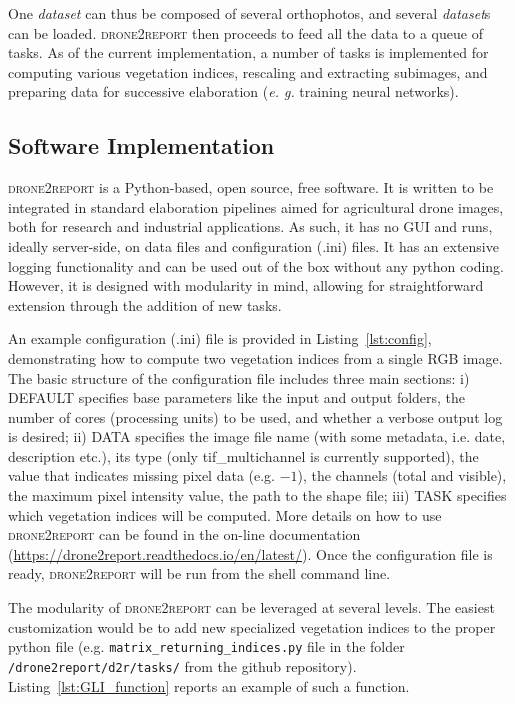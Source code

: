 \documentclass[drones,technicalnote,accept,pdftex,moreauthors]{Definitions/mdpi}
\begin{document}
One \textit{dataset} can thus be composed of several orthophotos, and several \textit{dataset}s can be loaded. \textsc{drone2report} then proceeds to feed all the data to a queue of tasks. As of the current implementation, a number of tasks is implemented for computing various vegetation indices, rescaling and extracting subimages, and preparing data for successive elaboration (\textit{e. g.} training neural networks). 

\subsection{Software Implementation}

\textsc{drone2report} is a Python-based, open source, free software. It is written to be integrated in standard elaboration pipelines aimed for agricultural drone images, both for research and industrial applications. As such, it has no GUI and runs, ideally server-side, on data files and configuration (.ini) files. It has an extensive logging functionality and can be used out of the box without any python coding. However, it is designed with modularity in mind, allowing for straightforward extension through the addition of new tasks.

An example configuration (.ini) file is provided in Listing~\ref{lst:config}, demonstrating how to compute two vegetation indices from a single RGB image.
The basic structure of the configuration file includes three main sections: i) DEFAULT specifies base parameters like the input and output folders, the number of cores (processing units) to be used, and whether a verbose output log is desired; ii) DATA specifies the image file name (with some metadata, i.e. date, description etc.), its type (only tif\_multichannel is currently supported), the value that indicates missing pixel data (e.g. $-1$), the channels (total and visible), the maximum pixel intensity value, the path to the shape file; iii) TASK specifies which vegetation indices will be computed. 
More details on how to use \textsc{drone2report} can be found in the on-line documentation (\url{https://drone2report.readthedocs.io/en/latest/}).
Once the configuration file is ready, \textsc{drone2report} will be run from the shell command line.

The modularity of \textsc{drone2report} can be leveraged at several levels. The easiest customization would be to add new specialized vegetation indices to the proper python file (e.g. \verb|matrix_returning_indices.py| file in the folder \verb|/drone2report/d2r/tasks/| from the github repository). Listing~\ref{lst:GLI_function} reports an example of such a function.
\end{document}
